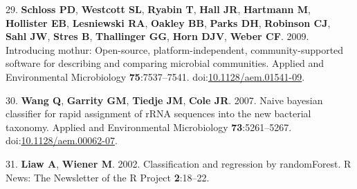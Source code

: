 \documentclass[11pt,]{article}
\begin{document}
\hypertarget{ref-Schloss2009}{}
29. \textbf{Schloss PD}, \textbf{Westcott SL}, \textbf{Ryabin T},
\textbf{Hall JR}, \textbf{Hartmann M}, \textbf{Hollister EB},
\textbf{Lesniewski RA}, \textbf{Oakley BB}, \textbf{Parks DH},
\textbf{Robinson CJ}, \textbf{Sahl JW}, \textbf{Stres B},
\textbf{Thallinger GG}, \textbf{Horn DJV}, \textbf{Weber CF}. 2009.
Introducing mothur: Open-source, platform-independent,
community-supported software for describing and comparing microbial
communities. Applied and Environmental Microbiology
\textbf{75}:7537--7541.
doi:\href{https://doi.org/10.1128/aem.01541-09}{10.1128/aem.01541-09}.

\hypertarget{ref-Wang2007}{}
30. \textbf{Wang Q}, \textbf{Garrity GM}, \textbf{Tiedje JM},
\textbf{Cole JR}. 2007. Naive bayesian classifier for rapid assignment
of rRNA sequences into the new bacterial taxonomy. Applied and
Environmental Microbiology \textbf{73}:5261--5267.
doi:\href{https://doi.org/10.1128/aem.00062-07}{10.1128/aem.00062-07}.

\hypertarget{ref-Liaw2002}{}
31. \textbf{Liaw A}, \textbf{Wiener M}. 2002. Classification and
regression by randomForest. R News: The Newsletter of the R Project
\textbf{2}:18--22.
\end{document}
